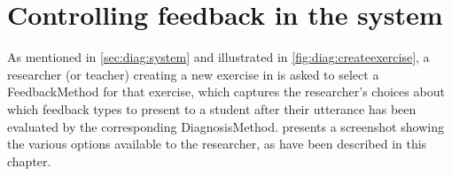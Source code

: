 %	
% 	
% 	
% 

%	
%	


\section{Controlling feedback in the system}
\label{sec:fb:system}

As mentioned in \cref{sec:diag:system} and illustrated in \cref{fig:diag:createexercise}, a researcher (or teacher) creating a new exercise in  is asked to select a FeedbackMethod for that exercise, which captures the researcher's choices about which feedback types to present to a student after their utterance has been evaluated by the corresponding DiagnosisMethod.  presents a screenshot showing the various options available to the researcher, as have been described in this chapter.


